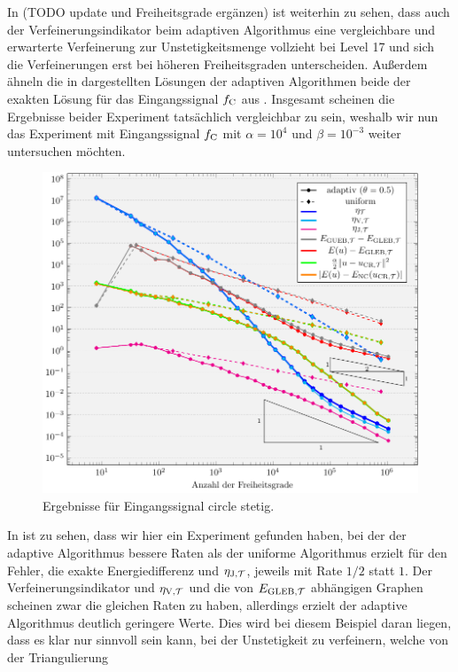 In  (TODO update und Freiheitsgrade ergänzen) ist
weiterhin zu sehen, dass auch der
Verfeinerungsindikator beim adaptiven Algorithmus eine vergleichbare und
erwarterte Verfeinerung zur Unstetigkeitsmenge vollzieht bei
Level 17 und sich die Verfeinerungen erst bei höheren Freiheitsgraden 
unterscheiden. 
Außerdem ähneln die in  dargestellten Lösungen der
adaptiven Algorithmen beide der exakten Lösung für das Eingangssignal
$f_\textup{C}$ aus .
Insgesamt scheinen die Ergebnisse beider Experiment tatsächlich vergleichbar
zu sein, weshalb wir nun das Experiment mit Eingangssignal $f_\textup{C}$
mit $\alpha=10^4$ und $\beta=10^{-3}$ weiter untersuchen möchten.
\begin{figure}[p]
  \centering
  \includegraphics[width=.8\linewidth]
    {pictures/chapExperiments/secGrayscale/circ/convCont.pdf}
  \caption{Ergebnisse für Eingangssignal circle stetig.}
  \label{fig:circContConvergence}
\end{figure}
In  ist zu sehen, dass wir hier ein Experiment
gefunden haben, bei der der adaptive Algorithmus bessere Raten als
der uniforme Algorithmus erzielt für den Fehler, die exakte Energiedifferenz
und $\eta_{\textup{J}, \mathcal{T}}$, jeweils mit Rate $1/2$ statt $1$.
Der Verfeinerungsindikator und $\eta_{\textup{V}, \mathcal{T}}$ und die von $E_{\textup{GLEB}, \mathcal{T}}$ abhängigen Graphen
scheinen zwar die gleichen Raten zu haben, allerdings erzielt der adaptive
Algorithmus deutlich geringere Werte.
Dies wird bei diesem Beispiel daran liegen, dass es klar nur sinnvoll sein
kann, bei der Unstetigkeit zu verfeinern, welche von der Triangulierung
